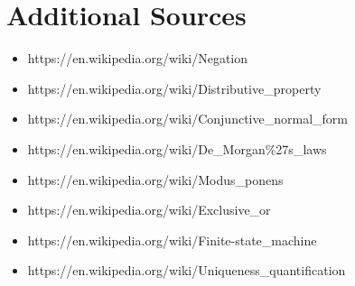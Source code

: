 \documentclass[a4paper, 14pt]{report}
\begin{document}
\pagebreak

\section*{Additional Sources}

\begin{itemize}[noitemsep]		
  \item https://en.wikipedia.org/wiki/Negation
  \item https://en.wikipedia.org/wiki/Distributive\_property
  \item https://en.wikipedia.org/wiki/Conjunctive\_normal\_form
  \item https://en.wikipedia.org/wiki/De\_Morgan\%27s\_laws
  \item https://en.wikipedia.org/wiki/Modus\_ponens
  \item https://en.wikipedia.org/wiki/Exclusive\_or
  \item https://en.wikipedia.org/wiki/Finite-state\_machine
  \item https://en.wikipedia.org/wiki/Uniqueness\_quantification
\end{itemize}		
\end{document}
